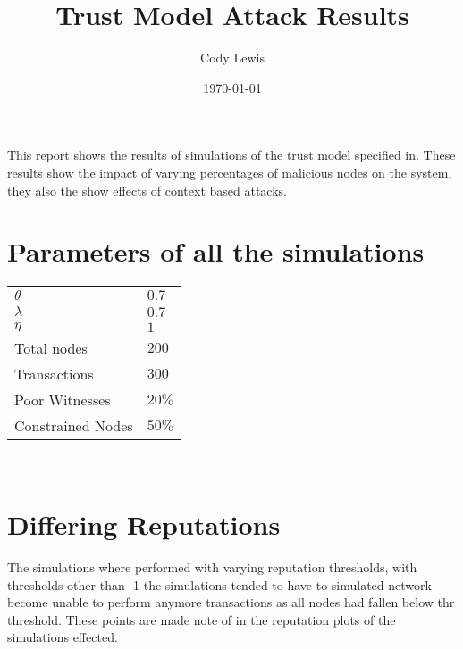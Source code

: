 \documentclass{article}
\title{Trust Model Attack Results}
\author{Cody Lewis}
\date{\today}
\begin{document}
  \maketitle
  This report shows the results of simulations of the trust model specified
  in\cite{saied13}. These results show the impact of varying percentages of
  malicious nodes on the system, they also the show effects of context based
  attacks.
  \section*{Parameters of all the simulations}
    \begin{tabularx}{\textwidth}{X X}
        \toprule
        $ \theta{} $ & $ 0.7 $ \\
        \midrule
        $ \lambda{} $ & $ 0.7 $ \\
        \midrule
        $ \eta{} $ & $ 1 $ \\
        \midrule
        Total nodes & $ 200 $ \\
        \midrule
        Transactions & $ 300 $ \\
        \midrule
        Poor Witnesses & $ 20\% $ \\
        \midrule
        Constrained Nodes & $ 50\% $ \\
        \bottomrule
    \end{tabularx} \\

    \section*{Differing Reputations}
    The simulations where performed with varying reputation thresholds,
    with thresholds other than -1 the simulations tended to have to simulated
    network become unable to perform anymore transactions as all nodes had
    fallen below thr threshold. These points are made note of in the
    reputation plots of the simulations effected.\
\end{document}
